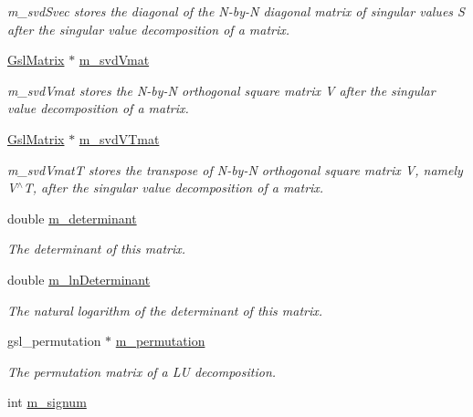 \begin{DoxyCompactItemize}
\begin{DoxyCompactList}\small\item\em m\-\_\-svd\-Svec stores the diagonal of the N-\/by-\/\-N diagonal matrix of singular values S after the singular value decomposition of a matrix. \end{DoxyCompactList}\item 
\hyperlink{class_q_u_e_s_o_1_1_gsl_matrix}{Gsl\-Matrix} $\ast$ \hyperlink{class_q_u_e_s_o_1_1_gsl_matrix_a13355e2467b03cf8ff514659802794e0}{m\-\_\-svd\-Vmat}
\begin{DoxyCompactList}\small\item\em m\-\_\-svd\-Vmat stores the N-\/by-\/\-N orthogonal square matrix V after the singular value decomposition of a matrix. \end{DoxyCompactList}\item 
\hyperlink{class_q_u_e_s_o_1_1_gsl_matrix}{Gsl\-Matrix} $\ast$ \hyperlink{class_q_u_e_s_o_1_1_gsl_matrix_a5aca6b693035268ddcd679affc465d47}{m\-\_\-svd\-V\-Tmat}
\begin{DoxyCompactList}\small\item\em m\-\_\-svd\-Vmat\-T stores the transpose of N-\/by-\/\-N orthogonal square matrix V, namely V$^\wedge$\-T, after the singular value decomposition of a matrix. \end{DoxyCompactList}\item 
double \hyperlink{class_q_u_e_s_o_1_1_gsl_matrix_a8be32859eb361fe9865d6df3a31aa579}{m\-\_\-determinant}
\begin{DoxyCompactList}\small\item\em The determinant of {\ttfamily this} matrix. \end{DoxyCompactList}\item 
double \hyperlink{class_q_u_e_s_o_1_1_gsl_matrix_a22b386a1106b9a583edea11bccf15cb9}{m\-\_\-ln\-Determinant}
\begin{DoxyCompactList}\small\item\em The natural logarithm of the determinant of {\ttfamily this} matrix. \end{DoxyCompactList}\item 
gsl\-\_\-permutation $\ast$ \hyperlink{class_q_u_e_s_o_1_1_gsl_matrix_a673277a250dca216e0e414110f63a9af}{m\-\_\-permutation}
\begin{DoxyCompactList}\small\item\em The permutation matrix of a L\-U decomposition. \end{DoxyCompactList}\item 
int \hyperlink{class_q_u_e_s_o_1_1_gsl_matrix_a591c6afd472ae02dd79e3a109ded4d51}{m\-\_\-signum}

\end{DoxyCompactItemize}
